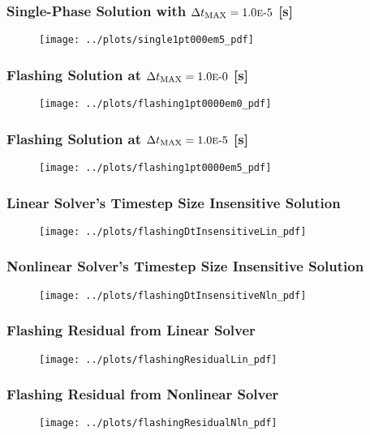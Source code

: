 \documentclass[compress,xcolor=table]{beamer}
\begin{document}
\begin{frame}
\frametitle{Single-Phase Solution with $\dtmax{} = \expneg{1.0}{5}$ [s]}

\begin{figure}[h!t]
\centering
\texttt{[image: ../plots/single1pt000em5\_pdf]}
\end{figure}

\end{frame}
\begin{frame}
\frametitle{Flashing Solution at $\dtmax{} = \expneg{1.0}{0}$ [s]}

\begin{figure}[h!t]
\centering
\texttt{[image: ../plots/flashing1pt0000em0\_pdf]}
\end{figure}

\end{frame}
\begin{frame}
\frametitle{Flashing Solution at $\dtmax{} = \expneg{1.0}{5}$ [s]}

\begin{figure}[h!t]
\centering
\texttt{[image: ../plots/flashing1pt0000em5\_pdf]}
\end{figure}

\end{frame}
\begin{frame}
\frametitle{Linear Solver's Timestep Size Insensitive Solution}

\begin{figure}[h!t]
\centering
\texttt{[image: ../plots/flashingDtInsensitiveLin\_pdf]}
\end{figure}

\end{frame}
\begin{frame}
\frametitle{Nonlinear Solver's Timestep Size Insensitive Solution}

\begin{figure}[h!t]
\centering
\texttt{[image: ../plots/flashingDtInsensitiveNln\_pdf]}
\end{figure}

\end{frame}
\begin{frame}
\frametitle{Flashing Residual from Linear Solver}

\begin{figure}[h!t]
\centering
\texttt{[image: ../plots/flashingResidualLin\_pdf]}
\end{figure}

\end{frame}
\begin{frame}
\frametitle{Flashing Residual from Nonlinear Solver}

\begin{figure}[h!t]
\centering
\texttt{[image: ../plots/flashingResidualNln\_pdf]}
\end{figure}

\end{frame}
\end{document}
